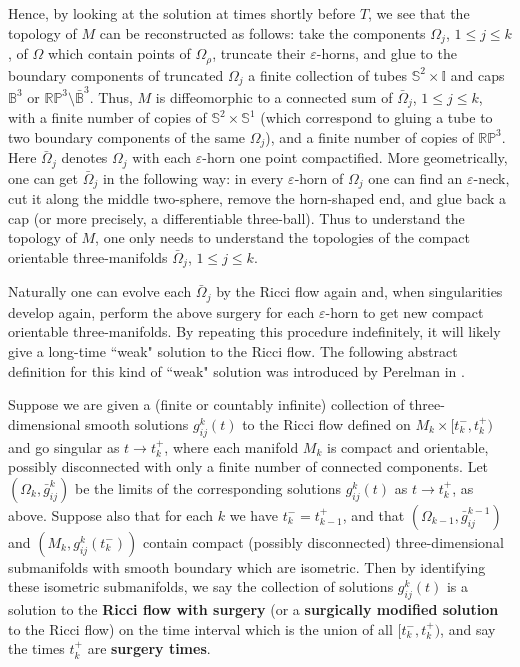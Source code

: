 Hence, by looking at the solution at times shortly before $T$, we
see that the topology of $M$ can be reconstructed as follows: take
the components $\Omega_j$, $1\le j\le k$, of $\Omega$ which
contain points of $\Omega_\rho$, truncate their
$\varepsilon$-horns, and glue to the boundary components of
truncated $\Omega_j$ a finite collection of tubes
$\mathbb{S}^2\times\mathbb{I}$ and caps $\mathbb{B}^3$ or
$\mathbb{RP}^3 \setminus \bar{\mathbb{B}}^3$. Thus, $M$ is
diffeomorphic to a connected sum of $\bar{\Omega}_j$, $1\le j\le
k$, with a finite number of copies of $\mathbb{S}^2\times
\mathbb{S}^1$ (which correspond to gluing a tube to two boundary
components of the same $\Omega_j$), and a finite number of copies
of $\mathbb{RP}^3$. Here $\bar{\Omega}_j$ denotes $\Omega_j$ with
each $\varepsilon$-horn one point compactified. More
geometrically, one can get $\bar{\Omega}_j$ in the following way:
in every $\varepsilon$-horn of $\Omega_j$ one can find an
$\varepsilon$-neck, cut it along the middle two-sphere, remove the
horn-shaped end, and glue back a cap (or more precisely, a
differentiable three-ball). Thus to understand the topology of
$M$, one only needs to understand the topologies of the compact
orientable three-manifolds $\bar{\Omega}_j$, $1\le j\le k$.

Naturally one can evolve each $\bar{\Omega}_j$ by the Ricci flow
again and, when singularities develop again, perform the above
surgery for each $\varepsilon$-horn to get new compact orientable
three-manifolds. By repeating this procedure indefinitely, it will
likely give a long-time ``weak" solution to the Ricci flow. The
following abstract definition for this kind of ``weak" solution
was introduced by Perelman in \cite{P2} .

\begin{definition}
  \label{def:cz-ricci-flow-with-surgery}

Suppose we are given a (finite or countably infinite) collection
of three-dimensional smooth solutions $g^k_{ij}(t)$ to the Ricci
flow defined on $M_k\times [t^-_k,t^+_k)$ and go singular as
$t\rightarrow t^+_k$, where each manifold $M_k$ is compact and
orientable, possibly disconnected with only a finite number of
connected components. Let $(\Omega_k,\bar{g}^k_{ij})$ be the
limits of the corresponding solutions $g^k_{ij}(t)$ as
$t\rightarrow t^+_k$, as above. Suppose also that for each $k$ we
have $t^-_k=t^+_{k-1}$, and that
$(\Omega_{k-1},\bar{g}^{k-1}_{ij})$ and $(M_k,g^k_{ij}(t^-_k))$
contain compact (possibly disconnected) three-dimensional
submanifolds with smooth boundary which are isometric. Then by
identifying these isometric submanifolds, we say the collection of
solutions $g^k_{ij}(t)$ is a solution to the \textbf{Ricci flow
with surgery} (or a
\textbf{surgically modified solution} to the Ricci flow)
 on the time interval which is
the union of all $[t^-_k,t^+_k)$, and say the times $t^+_k$ are
\textbf{surgery
times}. %
\end{definition}

